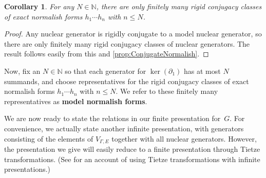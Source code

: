 \documentclass[11pt,letterpaper]{amsart}
\newtheorem{corollary}[theorem]{Corollary}
\theoremstyle{definition}
\newcommand{\newword}[1]{\textbf{#1}}
\newcommand{\N}{\mathbb{N}}
\begin{document}
\begin{corollary}\label{cor:FinitelyManyNormalishForms}
For any $N\in\N$, there are only finitely many rigid conjugacy classes of exact normalish forms $h_1\cdots h_n$ with $n\leq N$.
\end{corollary}

\begin{proof}
Any nuclear generator is rigidly conjugate to a model nuclear generator, so there are only finitely many rigid conjugacy classes of nuclear generators. 
 The result follows easily from this and \cref{prop:ConjugateNormalish}.
\end{proof}

Now, fix an $N\in\N$ so that each generator for $\ker(\partial_1)$ has at most $N$ summands, and choose representatives for the rigid conjugacy classes of exact normalish forms $h_1\cdots h_n$ with $n\leq N$.  We refer to these finitely many representatives as \newword{model normalish forms}.

We are now ready to state the relations in our finite presentation for~$G$. For convenience, we actually state another infinite presentation, with generators consisting of the elements of $V_{\Gamma,E}$ together with all nuclear generators.  However, the presentation we give will easily reduce to a finite presentation through Tietze transformations. (See \cite[Section~1.5]{magnus66} for an account of using Tietze transformations with infinite presentations.)
\end{document}
